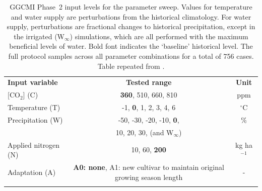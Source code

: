 \documentclass[gmdd]{copernicus} %
\begin{document}
\begin{table}[ht]
    \caption{
    GGCMI Phase~2 input levels for the parameter sweep. 
    Values for temperature and water supply are perturbations from the historical climatology. 
    For water supply, perturbations are fractional changes to historical precipitation, except in the irrigated (W$_{\infty}$) simulations, which are all performed with the maximum beneficial levels of water. 
    Bold font indicates the `baseline' historical level. 
    The full protocol samples across all parameter combinations for a total of 756 cases.
    Table repeated from \citet{franke2020ctwnexperiment}.
    }
    \label{table:inputs} 
    \begin{tabular}{lcc} 
        \tophline \vspace{1mm}
        \textbf{Input variable} & \textbf{Tested range} & \textbf{Unit} \\ \middlehline \vspace{1mm}
        [CO$_2$] (C) & \textbf{360}, 510, 660, 810 & ppm\\ \middlehline \vspace{1mm}
        Temperature (T) & -1, \textbf{0}, 1, 2, 3, 4, 6 & $^{\circ}$C\\ \middlehline \vspace{1mm}
        Precipitation (W) & -50, -30, -20, -10, \textbf{0}, & \% \\
        {} & 10, 20, 30, (and W$_{\infty}$) & {} \\ \middlehline \vspace{1mm}
        Applied nitrogen (N) & 10, 60, \textbf{200} & kg ha$^{-1}$ \\ \middlehline \vspace{1mm}
        Adaptation (A) & \textbf{A0: none}, A1: new cultivar to maintain original growing season length & -\\ \bottomhline
    \end{tabular}\\
\end{table}
\end{document}

